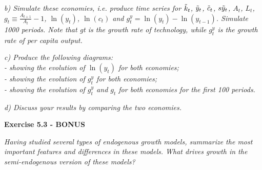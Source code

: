 \documentclass[11pt]{article} %
\begin{document}
\pagebreak
\textit{b) Simulate these economies, i.e. produce time series for $\Tilde{k}_t$, $\Tilde{y}_t$, $\Tilde{c}_t$, $s\Tilde{y}_t$, $A_t$, $L_t$, $g_t \equiv \frac{A_{t+1}}{A_t} - 1$, $\ln(y_t)$, $\ln(c_t)$ and $g_t^y = \ln(y_t) - \ln(y_{t-1})$. Simulate 1000 periods. Note that gt is the growth rate of technology, while $g_t^y$ is the growth rate of per capita output.}





\pagebreak
\textit{c) Produce the following diagrams:\\
- showing the evolution of $\ln(y_t)$ for both economies;\\
- showing the evolution of $g_t^y$ for both economies;\\
- showing the evolution of $g_t^y$ and $g_t$ for both economies for the first 100 periods.}




\pagebreak
\textit{d) Discuss your results by comparing the two economies.}




\pagebreak
\textbf{\Large{Exercise 5.3 - BONUS}}

\textit{Having studied several types of endogenous growth models, summarize the most important features and differences in these models. What drives growth in the semi-endogenous version of these models?}
\end{document}
